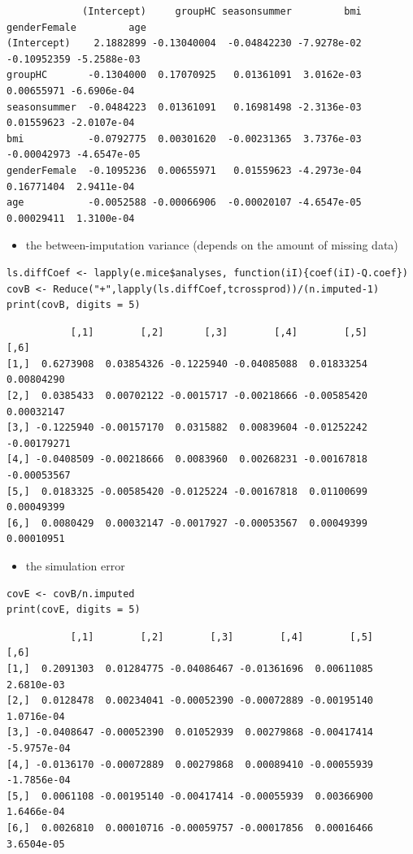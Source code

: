 \documentclass[12pt]{article}
\begin{document}
\begin{verbatim}
             (Intercept)     groupHC seasonsummer         bmi genderFemale         age
(Intercept)    2.1882899 -0.13040004  -0.04842230 -7.9278e-02  -0.10952359 -5.2588e-03
groupHC       -0.1304000  0.17070925   0.01361091  3.0162e-03   0.00655971 -6.6906e-04
seasonsummer  -0.0484223  0.01361091   0.16981498 -2.3136e-03   0.01559623 -2.0107e-04
bmi           -0.0792775  0.00301620  -0.00231365  3.7376e-03  -0.00042973 -4.6547e-05
genderFemale  -0.1095236  0.00655971   0.01559623 -4.2973e-04   0.16771404  2.9411e-04
age           -0.0052588 -0.00066906  -0.00020107 -4.6547e-05   0.00029411  1.3100e-04
\end{verbatim}

\begin{itemize}
\item the between-imputation variance (depends on the amount of missing data)
\end{itemize}
\lstset{language=r,label= ,caption= ,captionpos=b,numbers=none}
\begin{lstlisting}
ls.diffCoef <- lapply(e.mice$analyses, function(iI){coef(iI)-Q.coef})
covB <- Reduce("+",lapply(ls.diffCoef,tcrossprod))/(n.imputed-1)
print(covB, digits = 5)
\end{lstlisting}

\begin{verbatim}
           [,1]        [,2]       [,3]        [,4]        [,5]        [,6]
[1,]  0.6273908  0.03854326 -0.1225940 -0.04085088  0.01833254  0.00804290
[2,]  0.0385433  0.00702122 -0.0015717 -0.00218666 -0.00585420  0.00032147
[3,] -0.1225940 -0.00157170  0.0315882  0.00839604 -0.01252242 -0.00179271
[4,] -0.0408509 -0.00218666  0.0083960  0.00268231 -0.00167818 -0.00053567
[5,]  0.0183325 -0.00585420 -0.0125224 -0.00167818  0.01100699  0.00049399
[6,]  0.0080429  0.00032147 -0.0017927 -0.00053567  0.00049399  0.00010951
\end{verbatim}

\begin{itemize}
\item the simulation error
\end{itemize}
\lstset{language=r,label= ,caption= ,captionpos=b,numbers=none}
\begin{lstlisting}
covE <- covB/n.imputed
print(covE, digits = 5)
\end{lstlisting}

\begin{verbatim}
           [,1]        [,2]        [,3]        [,4]        [,5]        [,6]
[1,]  0.2091303  0.01284775 -0.04086467 -0.01361696  0.00611085  2.6810e-03
[2,]  0.0128478  0.00234041 -0.00052390 -0.00072889 -0.00195140  1.0716e-04
[3,] -0.0408647 -0.00052390  0.01052939  0.00279868 -0.00417414 -5.9757e-04
[4,] -0.0136170 -0.00072889  0.00279868  0.00089410 -0.00055939 -1.7856e-04
[5,]  0.0061108 -0.00195140 -0.00417414 -0.00055939  0.00366900  1.6466e-04
[6,]  0.0026810  0.00010716 -0.00059757 -0.00017856  0.00016466  3.6504e-05
\end{verbatim}
\end{document}
